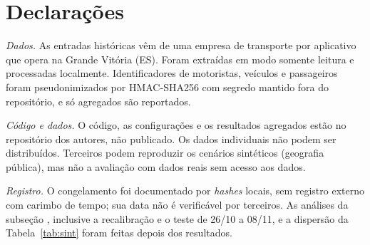 \section*{Declarações}

\textit{Dados.} As entradas históricas vêm de uma empresa de transporte por aplicativo que opera na Grande Vitória (ES). Foram extraídas em modo somente leitura e processadas localmente. Identificadores de motoristas, veículos e passageiros foram pseudonimizados por HMAC-SHA256 com segredo mantido fora do repositório, e só agregados são reportados.

\textit{Código e dados.} O código, as configurações e os resultados agregados estão no repositório dos autores, não publicado. Os dados individuais não podem ser distribuídos. Terceiros podem reproduzir os cenários sintéticos (geografia pública), mas não a avaliação com dados reais sem acesso aos dados.

\textit{Registro.} O congelamento foi documentado por \textit{hashes} locais, sem registro externo com carimbo de tempo; sua data não é verificável por terceiros. As análises da subseção , inclusive a recalibração e o teste de 26/10 a 08/11, e a dispersão da Tabela~\ref{tab:sint} foram feitas depois dos resultados.
